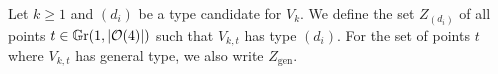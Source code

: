 



\begin{definition}
Let $k \geq 1$ and $(d_i)$ be a type candidate for $V_k$. We define the set
$Z_{(d_i)}$ of all points $t\in\mathbb G \mathrm r(1,\lvert\mathcal{O}(4)\rvert)$ such that $V_{k,t}$ has type $(d_i)$. For the set of points $t$ where $V_{k,t}$ has general type, we also write $Z_{\text{gen}}$.
\end{definition}






